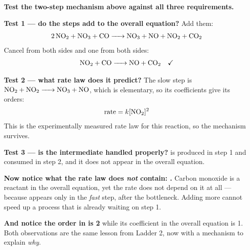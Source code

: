 \documentclass{apchem-worksheet}
\begin{document}
\begin{center}
\end{center}

\begin{workedexample}
\textbf{Test the two-step mechanism above against all three
requirements.}

\textbf{Test 1 --- do the steps add to the overall equation?} Add them:
\[ \ce{2NO2 + NO3 + CO -> NO3 + NO + NO2 + CO2} \]
Cancel  from both sides and one  from both sides:
\[ \ce{NO2 + CO -> NO + CO2} \quad\checkmark \]

\textbf{Test 2 --- what rate law does it predict?} The slow step is
$\ce{NO2 + NO2 -> NO3 + NO}$, which is elementary, so its coefficients
give its orders:
\[ \text{rate} = k[\ce{NO2}]^{2} \]
This is the experimentally measured rate law for this reaction, so the
mechanism survives.

\textbf{Test 3 --- is the intermediate handled properly?}  is
produced in step 1 and consumed in step 2, and it does not appear in the
overall equation. \quad\checkmark

\textbf{Now notice what the rate law does \emph{not} contain: .}
Carbon monoxide is a reactant in the overall equation, yet the rate does
not depend on it at all --- because  appears only in the
\emph{fast} step, after the bottleneck. Adding more  cannot speed
up a process that is already waiting on step 1.

\textbf{And notice the order in  is 2} while its coefficient in
the overall equation is 1. Both observations are the same lesson from
Ladder 2, now with a mechanism to explain \emph{why}.
\end{workedexample}
\end{document}
